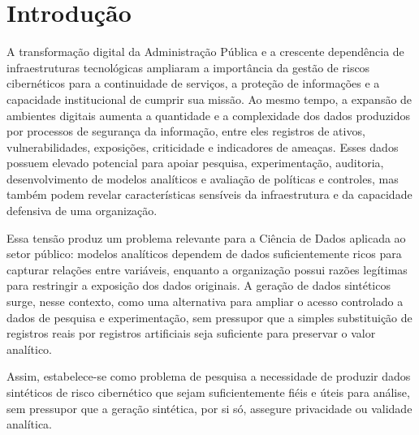 
\section{Introdução}

A transformação digital da Administração Pública e a crescente dependência de
infraestruturas tecnológicas ampliaram a importância da gestão de riscos
cibernéticos para a continuidade de serviços, a proteção de informações e a
capacidade institucional de cumprir sua missão. Ao mesmo tempo, a expansão de
ambientes digitais aumenta a quantidade e a complexidade dos dados produzidos por
processos de segurança da informação, entre eles registros de ativos,
vulnerabilidades, exposições, criticidade e indicadores de ameaças. Esses dados
possuem elevado potencial para apoiar pesquisa, experimentação, auditoria,
desenvolvimento de modelos analíticos e avaliação de políticas e controles, mas
também podem revelar características sensíveis da infraestrutura e da capacidade
defensiva de uma organização.

Essa tensão produz um problema relevante para a Ciência de Dados aplicada ao setor
público: modelos analíticos dependem de dados suficientemente ricos para capturar
relações entre variáveis, enquanto a organização possui razões legítimas para
restringir a exposição dos dados originais. A geração de dados sintéticos surge,
nesse contexto, como uma alternativa para ampliar o acesso controlado a dados de
pesquisa e experimentação, sem pressupor que a simples substituição de registros
reais por registros artificiais seja suficiente para preservar o valor analítico.

Assim, estabelece-se como problema de pesquisa a necessidade de produzir dados
sintéticos de risco cibernético que sejam suficientemente fiéis e úteis para
análise, sem pressupor que a geração sintética, por si só, assegure privacidade ou
validade analítica.
